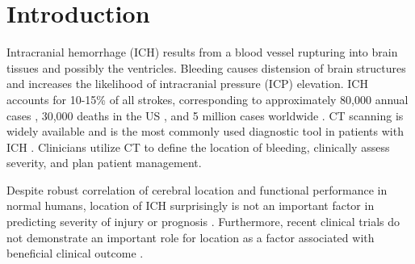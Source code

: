 \documentclass[10pt]{article}\usepackage[]{graphicx}\usepackage[]{color}
\begin{document}
\section{Introduction}
Intracranial hemorrhage (ICH) results from a blood vessel rupturing into brain tissues and possibly the ventricles.  Bleeding causes distension of brain structures and increases the likelihood of intracranial pressure (ICP) elevation.  ICH accounts for 10-15\% of all strokes, corresponding to approximately 80,000 annual cases \citep{go_heart_2013}, 30,000 deaths in the US \citep{qureshi_spontaneous_2001}, and 5 million cases worldwide \citep{krishnamurthi_global_2014}.  CT scanning is widely available and is the most commonly used diagnostic tool in patients with ICH \citep{sahni_management_2007}. Clinicians utilize CT to define the location of bleeding, clinically assess severity, and plan patient management. 

Despite robust correlation of cerebral location and functional performance in normal humans, location of ICH surprisingly is not an important factor in predicting severity of injury or prognosis \citep{tuhrim_validation_1995, ariesen_applicability_2005, selim_predictors_2002,
hemphill_ich_2001, hallevy_spontaneous_2002, cheung_use_2003}.  
Furthermore, recent clinical trials do not demonstrate an important role for location as a factor associated with beneficial clinical outcome \citep{mendelow_early_2005, mendelow_early_2013, anderson_intensive_2008, antihypertensive_treatment_of_acute_cerebral_hemorrhage_atach_investigators_antihypertensive_2010}.  

\end{document}
